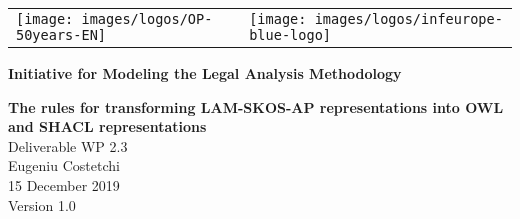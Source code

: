 
\newcommand{\DelTitle}{The rules for transforming LAM-SKOS-AP representations into OWL and SHACL representations}
\newcommand{\DelNumber}{WP 2.3}
\newcommand{\DelVersion}{1.0}
\newcommand{\DelAuthor}{Eugeniu Costetchi}
\newcommand{\DelDate}{15 December 2019}
\newcommand{\DelFilename}{wp2-3-transformation-rules}


\pagestyle{empty}
\graphicspath{{figures/}}

\begin{titlepage}
\begin{center}

\begin{center}
  \begin{center}
    \setlength{\tabcolsep}{0pt}
    \begin{tabular}{>{\raggedleft}m{3.5cm}>{\centering}m{\dimexpr\textwidth - 8cm\relax}>{\raggedright}m{3.5cm}}
      \texttt{[image: images/logos/OP-50years-EN]}%
      &%
      &%
      \texttt{[image: images/logos/infeurope-blue-logo]} %
    \end{tabular}
  \end{center}


  \vspace{2mm}

  \end{center}
  \vspace{4cm}
  \textbf{{\large Initiative for Modeling the Legal Analysis Methodology\\}}
  \vspace{2cm}
  
  \begin{spacing}{2.5}
    \textbf{\Huge \DelTitle}\\ \vspace{2cm}
    {\large Deliverable \DelNumber} \\ %
  {\large \DelAuthor} \\ %
  {\large \DelDate} \\ %
    {\large Version \DelVersion}
  \end{spacing}
  
  \vspace*{\fill}


\end{center}
\end{titlepage}


